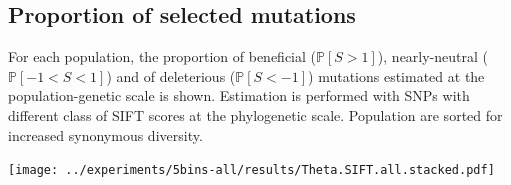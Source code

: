 \documentclass{article}
\newcommand{\proba}{\mathbb{P}}
\newcommand{\Spop}{S}
\newcommand{\polyDel}{\Spop < -1}
\newcommand{\polyNeutral}{-1 < \Spop < 1}
\newcommand{\polyAdv}{ \Spop > 1}
\newcommand{\PpolyDel}{\proba \left[ \polyDel \right]}
\newcommand{\PpolyNeutral}{\proba \left[ \polyNeutral \right]}
\newcommand{\PpolyAdv}{\proba \left[ \polyAdv \right]}
\begin{document}
    \subsection{Proportion of selected mutations}\label{subsec:proportion-of-selected-mutations}
    For each population, the proportion of beneficial ($\PpolyAdv$), nearly-neutral ($\PpolyNeutral$) and of deleterious ($\PpolyDel$) mutations estimated at the population-genetic scale is shown.
    Estimation is performed with SNPs with different class of SIFT scores at the phylogenetic scale.
    Population are sorted for increased synonymous diversity.

    \begin{center}
        \begin{minipage}{0.9\linewidth}
            \texttt{[image: ../experiments/5bins-all/results/Theta.SIFT.all.stacked.pdf]}
        \end{minipage}
        \begin{minipage}{0.09\linewidth}

\end{minipage}
\end{center}
\end{document}
